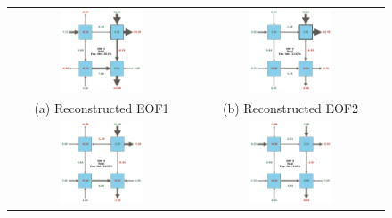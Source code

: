 \begin{figure}[!htbp]
\centering
\begin{tabular}{cc}
\includegraphics[width=0.46\textwidth]{figs_appendix/Total_eof1_with_mean.png} & 
\includegraphics[width=0.46\textwidth]{figs_appendix/Total_eof2_with_mean.png} \\
(a) Reconstructed EOF1 & (b) Reconstructed EOF2 \\
\includegraphics[width=0.46\textwidth]{figs_appendix/Total_eof3_with_mean.png} & 
\includegraphics[width=0.46\textwidth]{figs_appendix/Total_eof4_with_mean.png} \\

\end{tabular}
\end{figure}
